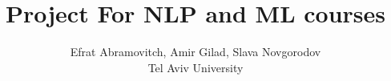 \documentclass[10pt]{article}
\begin{document}
\title{
Project For NLP and ML courses}

\author{Efrat Abramovitch, Amir Gilad, Slava Novgorodov
\\ Tel Aviv University
 }
\maketitle




{\small

}
\end{document}
